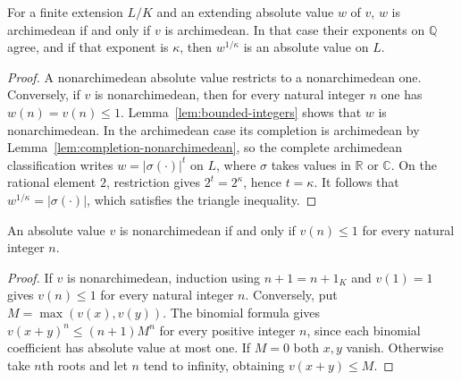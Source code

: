 \begin{lemma}\label{lem:archimedean-extension}
\leanok
{}
For a finite extension $L/K$ and an extending absolute value $w$ of $v$,
$w$ is archimedean if and only if $v$ is archimedean. In that case their
exponents on $\mathbb Q$ agree, and if that exponent is $\kappa$, then
$w^{1/\kappa}$ is an absolute value on $L$.
\end{lemma}
\begin{proof}
A nonarchimedean absolute value restricts to a nonarchimedean one.
Conversely, if $v$ is nonarchimedean, then for every natural integer $n$
one has $w(n)=v(n)\leq1$. Lemma~\ref{lem:bounded-integers} shows that
$w$ is nonarchimedean. In the archimedean case its completion is
archimedean by Lemma~\ref{lem:completion-nonarchimedean}, so the complete
archimedean classification writes
$w=|\sigma(\cdot)|^t$ on $L$, where $\sigma$ takes values in
$\mathbb R$ or $\mathbb C$. On the rational element $2$, restriction
gives $2^t=2^\kappa$, hence $t=\kappa$. It follows that
$w^{1/\kappa}=|\sigma(\cdot)|$, which satisfies the triangle inequality.
\end{proof}

\begin{lemma}
\label{lem:bounded-integers}
\leanok
{}
An absolute value $v$ is nonarchimedean if and only if $v(n)\leq1$ for every natural
integer $n$.
\end{lemma}
\begin{proof}
If $v$ is nonarchimedean, induction using $n+1=n+1_K$ and $v(1)=1$
gives $v(n)\leq1$ for every natural integer $n$.
Conversely, put $M=\max(v(x),v(y))$. The binomial formula gives
$v(x+y)^n\leq(n+1)M^n$ for every positive integer $n$, since each
binomial coefficient has absolute value at most one. If $M=0$ both $x,y$
vanish. Otherwise take $n$th roots and let $n$ tend to infinity, obtaining
$v(x+y)\leq M$.
\end{proof}

